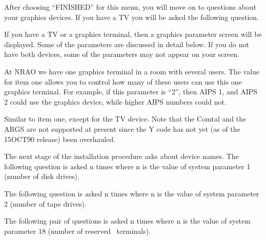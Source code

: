 After choosing ``FINISHED'' for this menu, you will move on to questions
about your graphics devices.  If you have a TV you will be asked the
following question.\medskip

\medskip

\noindent
If you have a TV or a graphics terminal, then a graphics parameter
screen will be displayed.  Some of the parameters are discussed in
detail below.  If you do not have both devices, some of the parameters
may not appear on your screen.\medskip

\medskip

\noindent
At NRAO we have one graphics terminal in a room with several users.
The value for item one allows you to control how many of these users
can use this one graphics terminal.  For example, if this parameter is
``2'', then AIPS 1, and AIPS 2 could use the graphics device, while
higher AIPS numbers could not.\medskip

\medskip

\noindent
Similar to item one, except for the TV device.  Note that the Comtal
and the ARGS are not supported at present since the Y code has not yet
(as of the 15OCT90 release) been overhauled.\medskip

\medskip

\noindent
The next stage of the installation procedure asks about device names.
The following question is asked n times where n is the value of system
parameter 1 (number of disk drives).\medskip

\medskip

\noindent
The following question is asked n times where n is the value of system
parameter 2 (number of tape drives).\medskip

\medskip

\noindent
The following pair of questions is asked n times where n is the value
of system parameter 18 (number of reserved \aips\ terminals).\medskip

\medskip


